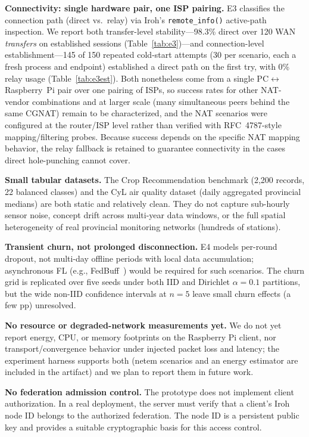 \documentclass[a4paper,fleqn]{cas-dc}
\begin{document}
\textbf{Connectivity: single hardware pair, one ISP pairing.} E3 classifies the connection path (direct vs.~relay) via Iroh's \texttt{remote\_info()} active-path inspection. We report both transfer-level stability---98.3\% direct over 120 WAN \emph{transfers} on established sessions (Table~\ref{tab:e3})---and connection-level establishment---145 of 150 repeated cold-start attempts (30 per scenario, each a fresh process and endpoint) established a direct path on the first try, with 0\% relay usage (Table~\ref{tab:e3est}). Both nonetheless come from a single PC$\leftrightarrow$Raspberry~Pi pair over one pairing of ISPs, so success rates for other NAT-vendor combinations and at larger scale (many simultaneous peers behind the same CGNAT) remain to be characterized, and the NAT scenarios were configured at the router/ISP level rather than verified with RFC~4787-style mapping/filtering probes. Because success depends on the specific NAT mapping behavior, the relay fallback is retained to guarantee connectivity in the cases direct hole-punching cannot cover.

\textbf{Small tabular datasets.} The Crop Recommendation benchmark (2,200 records, 22 balanced classes) and the CyL air quality dataset (daily aggregated provincial medians) are both static and relatively clean. They do not capture sub-hourly sensor noise, concept drift across multi-year data windows, or the full spatial heterogeneity of real provincial monitoring networks (hundreds of stations).

\textbf{Transient churn, not prolonged disconnection.} E4 models per-round dropout, not multi-day offline periods with local data accumulation; asynchronous FL (e.g., FedBuff~\cite{fedbuff2022}) would be required for such scenarios. The churn grid is replicated over five seeds under both IID and Dirichlet $\alpha{=}0.1$ partitions, but the wide non-IID confidence intervals at $n{=}5$ leave small churn effects (a few pp) unresolved.

\textbf{No resource or degraded-network measurements yet.} We do not yet report energy, CPU, or memory footprints on the Raspberry Pi client, nor transport/convergence behavior under injected packet loss and latency; the experiment harness supports both (netem scenarios and an energy estimator are included in the artifact) and we plan to report them in future work.

\textbf{No federation admission control.} The prototype does not implement client authorization. In a real deployment, the server must verify that a client's Iroh node ID belongs to the authorized federation. The node ID is a persistent public key and provides a suitable cryptographic basis for this access control.
\end{document}
